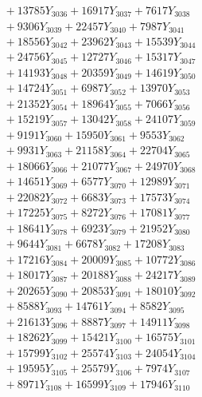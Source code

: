 \documentclass[a4paper,10pt]{article}
\begin{document}
{\begin{align}
&\;  + 13785 Y_{3036} + 16917 Y_{3037} + 7617 Y_{3038} \\[0.3ex]
&\;  + 9306 Y_{3039} + 22457 Y_{3040} + 7987 Y_{3041} \\[0.3ex]
&\;  + 18556 Y_{3042} + 23962 Y_{3043} + 15539 Y_{3044} \\[0.3ex]
&\;  + 24756 Y_{3045} + 12727 Y_{3046} + 15317 Y_{3047} \\[0.3ex]
&\;  + 14193 Y_{3048} + 20359 Y_{3049} + 14619 Y_{3050} \\[0.3ex]
&\;  + 14724 Y_{3051} + 6987 Y_{3052} + 13970 Y_{3053} \\[0.3ex]
&\;  + 21352 Y_{3054} + 18964 Y_{3055} + 7066 Y_{3056} \\[0.3ex]
&\;  + 15219 Y_{3057} + 13042 Y_{3058} + 24107 Y_{3059} \\[0.5ex]\allowbreak
&\;  + 9191 Y_{3060} + 15950 Y_{3061} + 9553 Y_{3062} \\[0.3ex]
&\;  + 9931 Y_{3063} + 21158 Y_{3064} + 22704 Y_{3065} \\[0.3ex]
&\;  + 18066 Y_{3066} + 21077 Y_{3067} + 24970 Y_{3068} \\[0.3ex]
&\;  + 14651 Y_{3069} + 6577 Y_{3070} + 12989 Y_{3071} \\[0.3ex]
&\;  + 22082 Y_{3072} + 6683 Y_{3073} + 17573 Y_{3074} \\[0.3ex]
&\;  + 17225 Y_{3075} + 8272 Y_{3076} + 17081 Y_{3077} \\[0.3ex]
&\;  + 18641 Y_{3078} + 6923 Y_{3079} + 21952 Y_{3080} \\[0.3ex]
&\;  + 9644 Y_{3081} + 6678 Y_{3082} + 17208 Y_{3083} \\[0.3ex]
&\;  + 17216 Y_{3084} + 20009 Y_{3085} + 10772 Y_{3086} \\[0.3ex]
&\;  + 18017 Y_{3087} + 20188 Y_{3088} + 24217 Y_{3089} \\[0.5ex]\allowbreak
&\;  + 20265 Y_{3090} + 20853 Y_{3091} + 18010 Y_{3092} \\[0.3ex]
&\;  + 8588 Y_{3093} + 14761 Y_{3094} + 8582 Y_{3095} \\[0.3ex]
&\;  + 21613 Y_{3096} + 8887 Y_{3097} + 14911 Y_{3098} \\[0.3ex]
&\;  + 18262 Y_{3099} + 15421 Y_{3100} + 16575 Y_{3101} \\[0.3ex]
&\;  + 15799 Y_{3102} + 25574 Y_{3103} + 24054 Y_{3104} \\[0.3ex]
&\;  + 19595 Y_{3105} + 25579 Y_{3106} + 7974 Y_{3107} \\[0.3ex]
&\;  + 8971 Y_{3108} + 16599 Y_{3109} + 17946 Y_{3110} \\[0.3ex]

\end{align}}
\end{document}
